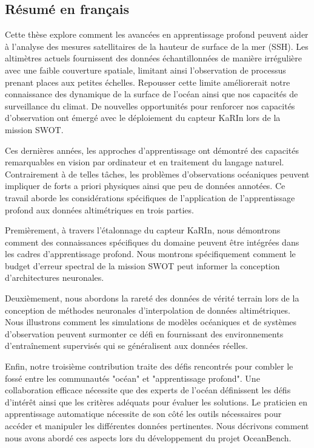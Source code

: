 \begin{bibunit}

\chapter*{Résumé en français}
Cette thèse explore comment les avancées en apprentissage profond peuvent aider à l'analyse des mesures satellitaires de la hauteur de surface de la mer (SSH). Les altimètres actuels fournissent des données échantillonnées de manière irrégulière avec une faible couverture spatiale, limitant ainsi l'observation de processus prenant places aux petites échelles. Repousser cette limite améliorerait notre connaissance des dynamique de la surface de l'océan ainsi que nos capacités de surveillance du climat. De nouvelles opportunités pour renforcer nos capacités d'observation ont émergé avec le déploiement du capteur KaRIn lors de la mission SWOT.

Ces dernières années, les approches d'apprentissage ont démontré des capacités remarquables en vision par ordinateur et en traitement du langage naturel. Contrairement à de telles tâches, les problèmes d'observations océaniques peuvent impliquer de forts a priori physiques ainsi que peu de données annotées. Ce travail aborde les considérations spécifiques de l'application de l'apprentissage profond aux données altimétriques en trois parties.

Premièrement, à travers l'étalonnage du capteur KaRIn, nous démontrons comment des connaissances spécifiques du domaine peuvent être intégrées dans les cadres d'apprentissage profond. Nous montrons spécifiquement comment le budget d'erreur spectral de la mission SWOT peut informer la conception d'architectures neuronales.

Deuxièmement, nous abordons la rareté des données de vérité terrain lors de la conception de méthodes neuronales d'interpolation de données altimétriques. Nous illustrons comment les simulations de modèles océaniques et de systèmes d'observation peuvent surmonter ce défi en fournissant des environnements d'entraînement supervisés qui se généralisent aux données réelles.

Enfin, notre troisième contribution traite des défis rencontrés pour combler le fossé entre les communautés "océan" et "apprentissage profond". Une collaboration efficace nécessite que des experts de l'océan définissent les défis d'intérêt ainsi que les critères adéquats pour évaluer les solutions. Le praticien en apprentissage automatique nécessite de son côté les outils nécessaires pour accéder et manipuler les différentes données pertinentes.  Nous décrivons comment nous avons abordé ces aspects lors du développement du projet OceanBench.


\end{bibunit}
